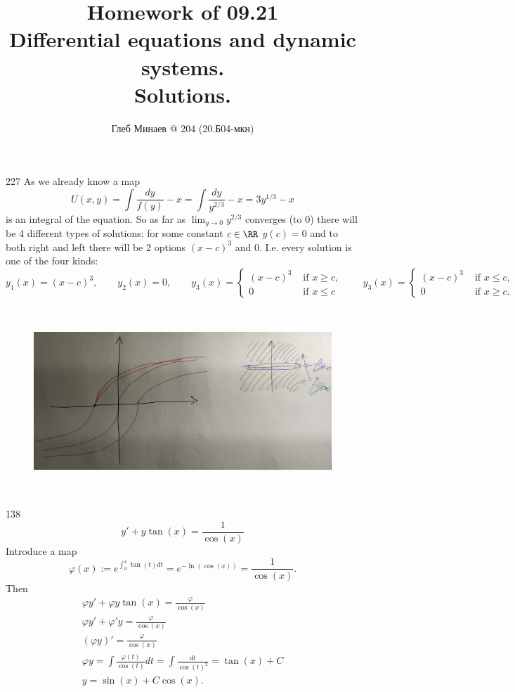 \documentclass[12pt,a4paper]{article}
\title{Homework of 09.21\\Differential equations and dynamic systems.\\Solutions.}
\author{Глеб Минаев @ 204 (20.Б04-мкн)}
\date{}
\begin{document}
    \maketitle

    \begin{problem}{227}
        As we already know a map
        \[U(x, y) = \int \frac{dy}{f(y)} - x = \int \frac{dy}{y^{2/3}} - x = 3 y^{1/3} - x\]
        is an integral of the equation. So as far as $\lim_{y \to 0} y^{2/3}$ converges (to $0$) there will be 4 different types of solutions: for some constant $c \in \RR$ $y(c) = 0$ and to both right and left there will be 2 options $(x-c)^3$ and $0$. I.e. every solution is one of the four kinds:
        \[
            y_1(x) = (x-c)^3,
            \qquad
            y_2(x) = 0,
            \qquad
            y_3(x) =
            \begin{cases}
                (x-c)^3& \text{ if } x \geqslant c,\\
                0& \text{ if } x \leqslant c
            \end{cases}
            \qquad
            y_3(x) =
            \begin{cases}
                (x-c)^3& \text{ if } x \leqslant c,\\
                0& \text{ if } x \geqslant c.
            \end{cases}
        \]
        \begin{figure}[H]
            \centering
            \includegraphics[height=7cm]{DEaDS-HW-003-1.jpg}
        \end{figure}
    \end{problem}

    \begin{problem}{138}
        \[y' + y \tan(x) = \frac{1}{\cos(x)}\]
        Introduce a map
        \[\varphi(x) := e^{\int_0^x \tan(t) dt} = e^{-\ln(\cos(x))} = \frac{1}{\cos(x)}.\]
        Then
        \begin{gather*}
            \varphi y' + \varphi y \tan(x) = \frac{\varphi}{\cos(x)}\\
            \varphi y' + \varphi' y = \frac{\varphi}{\cos(x)}\\
            (\varphi y)' = \frac{\varphi}{\cos(x)}\\
            \varphi y = \int \frac{\varphi(t)}{\cos(t)} dt = \int \frac{dt}{\cos(t)^2} = \tan(x) + C\\
            y = \sin(x) + C \cos(x).
        \end{gather*}
    \end{problem}
\end{document}
